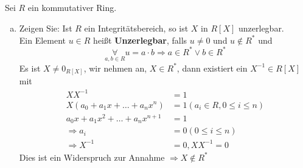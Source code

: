 \documentclass{article}
\begin{document}
\subsection{}
\color{blue}
Sei $R$ ein kommutativer Ring.
\color{black}
\begin{enumerate}[(a)]
    \item
        \color{blue}
        Zeigen Sie: Ist $R$ ein Integritätsbereich, so ist $X$ in $R[X]$ unzerlegbar.\\
        \color{purple}
        Ein Element $u\in R$ heißt \textbf{Unzerlegbar}, falls $u\neq 0$
        und $u\notin R^*$ und
        \begin{equation*}
            \underset{a,b\in R}\forall u=a\cdot b
            \Rightarrow a\in R^*\lor b\in R^*
        \end{equation*}
        \color{black}
        Es ist $X\neq 0_{R[X]}$, wir nehmen an, $X\in R^*$, dann existiert
        ein $X^{-1}\in R[X]$ mit
        \begin{align*}
            XX^{-1}&=1\\
            X(a_0+a_1x+\hdots+a_nx^n)&=1 (a_i\in R, 0\leq i\leq n)\\
            a_0x+a_1x^2+\hdots+a_nx^{n+1}&=1\\
            \Rightarrow a_i&=0 (0\leq i\leq n)\\
            \Rightarrow X^{-1}&=0,XX^{-1}=0
        \end{align*}
        Dies ist ein Widerspruch zur Annahme $\Rightarrow X\notin R^*$


\end{enumerate}
\end{document}
